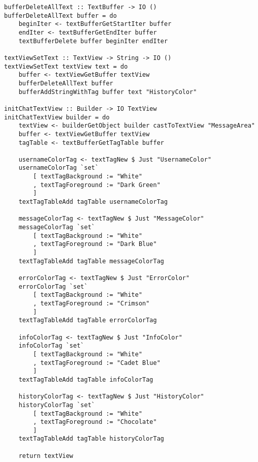 \documentclass[russian,utf8,simple,emptystyle]{eskdtext}
\begin{document}
\begin{lstlisting}
bufferDeleteAllText :: TextBuffer -> IO ()
bufferDeleteAllText buffer = do 
    beginIter <- textBufferGetStartIter buffer 
    endIter <- textBufferGetEndIter buffer 
    textBufferDelete buffer beginIter endIter 

textViewSetText :: TextView -> String -> IO ()
textViewSetText textView text = do 
    buffer <- textViewGetBuffer textView 
    bufferDeleteAllText buffer 
    bufferAddStringWithTag buffer text "HistoryColor"

initChatTextView :: Builder -> IO TextView
initChatTextView builder = do 
    textView <- builderGetObject builder castToTextView "MessageArea"
    buffer <- textViewGetBuffer textView
    tagTable <- textBufferGetTagTable buffer

    usernameColorTag <- textTagNew $ Just "UsernameColor"
    usernameColorTag `set` 
        [ textTagBackground := "White"
        , textTagForeground := "Dark Green"
        ]
    textTagTableAdd tagTable usernameColorTag

    messageColorTag <- textTagNew $ Just "MessageColor"
    messageColorTag `set` 
        [ textTagBackground := "White"
        , textTagForeground := "Dark Blue"
        ]
    textTagTableAdd tagTable messageColorTag

    errorColorTag <- textTagNew $ Just "ErrorColor"
    errorColorTag `set` 
        [ textTagBackground := "White"
        , textTagForeground := "Crimson"
        ]
    textTagTableAdd tagTable errorColorTag

    infoColorTag <- textTagNew $ Just "InfoColor"
    infoColorTag `set` 
        [ textTagBackground := "White"
        , textTagForeground := "Cadet Blue"
        ]
    textTagTableAdd tagTable infoColorTag

    historyColorTag <- textTagNew $ Just "HistoryColor"
    historyColorTag `set` 
        [ textTagBackground := "White"
        , textTagForeground := "Chocolate"
        ]
    textTagTableAdd tagTable historyColorTag

    return textView
\end{lstlisting}
\end{document}
